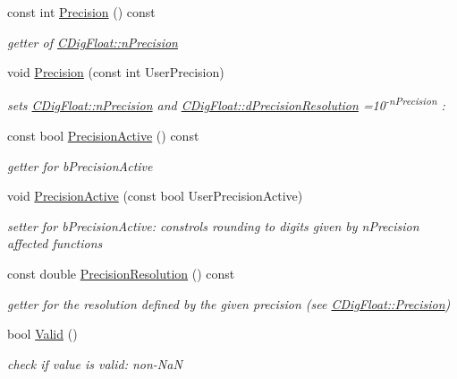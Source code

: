 \begin{DoxyCompactItemize}
const int \hyperlink{classCDigFloat_a95875f6f7246debee0d00b0c41c82aee}{Precision} () const
\begin{DoxyCompactList}\small\item\em getter of \hyperlink{classCDigFloat_ad580654be35246d14c91482581c0bc11}{C\+Dig\+Float\+::n\+Precision} \end{DoxyCompactList}\item 
void \hyperlink{classCDigFloat_a6d12203e256d0fba602b3cfec37f96a6}{Precision} (const int User\+Precision)
\begin{DoxyCompactList}\small\item\em sets \hyperlink{classCDigFloat_ad580654be35246d14c91482581c0bc11}{C\+Dig\+Float\+::n\+Precision} and \hyperlink{classCDigFloat_a7f9809fa0b25da57f5c8c18a02b7d1a7}{C\+Dig\+Float\+::d\+Precision\+Resolution} =10\textsuperscript{-\/n\+Precision} \+: \end{DoxyCompactList}\item 
const bool \hyperlink{classCDigFloat_a4d6ca24beda280be719374c2a6b2c64d}{Precision\+Active} () const
\begin{DoxyCompactList}\small\item\em getter for b\+Precision\+Active \end{DoxyCompactList}\item 
void \hyperlink{classCDigFloat_a680354bead4079c14a67688124bb4b85}{Precision\+Active} (const bool User\+Precision\+Active)
\begin{DoxyCompactList}\small\item\em setter for b\+Precision\+Active\+: constrols rounding to digits given by n\+Precision affected functions \end{DoxyCompactList}\item 
const double \hyperlink{classCDigFloat_ad39db10046bbfd27c2537581bdb7e073}{Precision\+Resolution} () const
\begin{DoxyCompactList}\small\item\em getter for the resolution defined by the given precision (see \hyperlink{classCDigFloat_a95875f6f7246debee0d00b0c41c82aee}{C\+Dig\+Float\+::\+Precision}) \end{DoxyCompactList}\item 
bool \hyperlink{classCDigFloat_aab339f7e1ffa5c88f3dbb432389752c9}{Valid} ()
\begin{DoxyCompactList}\small\item\em check if value is valid\+: non-\/\+NaN \end{DoxyCompactList}\item 

\end{DoxyCompactItemize}
